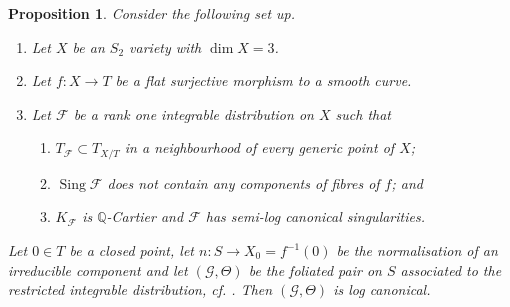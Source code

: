 \documentclass[12pt, a4paper]{amsart}
\DeclareMathOperator{\sing}{Sing}
\newtheorem{proposition}[theorem]{Proposition}
\theoremstyle{definition}
\theoremstyle{named}
\begin{document}
\begin{proposition}
\label{prop_locally_stable_adjunction}
Consider the following set up.
\begin{enumerate}
    \item Let $X$ be an $S_2$ variety with $\dim X = 3$. 
    \item Let $f\colon X \to T$ be a flat surjective morphism to a smooth curve.
    \item Let $\mathcal F$ be a rank one integrable distribution on $X$ such that
    \begin{enumerate} 
    \item $T_{\mathcal F} \subset T_{X/T}$ in a neighbourhood of every generic point of $X$; 
    \item $\sing \mathcal F$ does not 
contain any components of fibres of $f$; and
\item $K_{\mathcal F}$
is $\mathbb Q$-Cartier and $\mathcal F$ has semi-log canonical singularities.
\end{enumerate}
\end{enumerate}

Let $0 \in T$ be a closed point, let $n\colon S \rightarrow X_0 = f^{-1}(0)$ be the normalisation of an irreducible component and let $(\mathcal G, \Theta)$ be the foliated pair on $S$ associated to the restricted integrable distribution, cf. \cite[Proposition-Definition 3.12]{CS23b}.  
Then $(\mathcal G, \Theta)$ is log canonical.    
\end{proposition}
\end{document}
